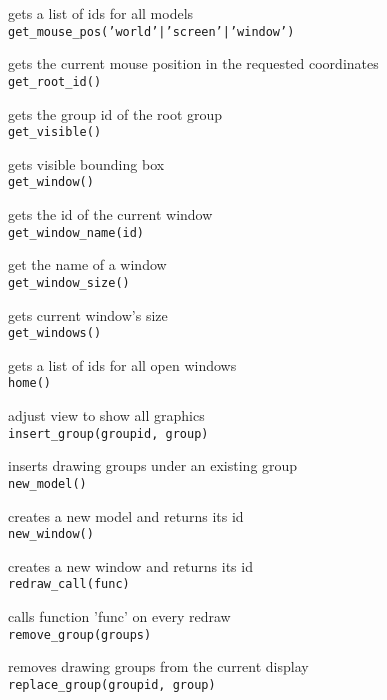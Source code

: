 gets a list of ids for all models \\


{\tt get\_mouse\_pos('world'|'screen'|'window') }

gets the current mouse position in the requested coordinates \\


{\tt get\_root\_id() }

gets the group id of the root group \\


{\tt get\_visible() }

gets visible bounding box \\


{\tt get\_window() }

gets the id of the current window \\


{\tt get\_window\_name(id) }

get the name of a window \\


{\tt get\_window\_size() }

gets current window's size \\


{\tt get\_windows() }

gets a list of ids for all open windows \\


{\tt home() }

adjust view to show all graphics \\


{\tt insert\_group(groupid, group) }

inserts drawing groups under an existing group \\


{\tt new\_model() }

creates a new model and returns its id \\


{\tt new\_window() }

creates a new window and returns its id \\


{\tt redraw\_call(func) }

calls function 'func' on every redraw \\


{\tt remove\_group(groups) }

removes drawing groups from the current display \\


{\tt replace\_group(groupid, group) }


